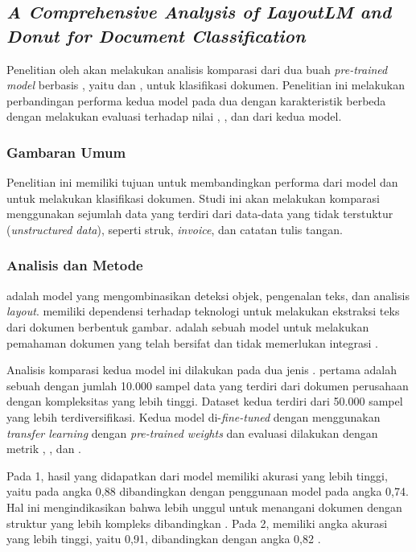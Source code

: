 \subsection{\textit{A Comprehensive Analysis of LayoutLM and Donut for Document Classification}}
\label{sec:penelitian-1}
Penelitian oleh   akan melakukan analisis komparasi dari dua buah \textit{pre-trained model} berbasis \transformer{}, yaitu \layoutlm{} dan \donut, untuk klasifikasi dokumen. Penelitian ini melakukan perbandingan performa kedua model pada dua \dataset{} dengan karakteristik berbeda dengan melakukan evaluasi 
terhadap nilai \accuracy, \precision, dan \fscore{} dari kedua model. 

\subsubsection{Gambaran Umum}
Penelitian ini memiliki tujuan untuk membandingkan performa dari model \donut{} dan \layoutlm{} untuk melakukan klasifikasi dokumen. Studi ini akan 
melakukan komparasi menggunakan sejumlah data yang terdiri dari data-data yang tidak terstuktur (\textit{unstructured data}), seperti struk, \textit{invoice}, dan catatan tulis tangan.

\subsubsection{Analisis dan Metode}
\layoutlm{} adalah model yang mengombinasikan deteksi objek, pengenalan teks, dan analisis \textit{layout}. \layoutlm{} memiliki dependensi terhadap teknologi \ocr{} untuk melakukan ekstraksi teks dari dokumen berbentuk gambar. \donut{} adalah sebuah model \transformer{} untuk melakukan pemahaman dokumen yang telah bersifat \sotafull{} dan tidak memerlukan integrasi \ocr{}.

Analisis komparasi kedua model ini dilakukan pada dua jenis \dataset. \datasetfl{} pertama adalah sebuah \dataset{} dengan jumlah 10.000 sampel data yang terdiri dari dokumen perusahaan dengan kompleksitas yang lebih tinggi. Dataset 
kedua terdiri dari 50.000 sampel yang lebih terdiversifikasi. Kedua model di-\textit{fine-tuned} dengan menggunakan \textit{transfer learning} dengan \textit{pre-trained weights} dan evaluasi dilakukan dengan metrik \accuracy, \precision, dan \fscore.  

Pada \dataset{} 1, hasil yang didapatkan dari model \layoutlm{} memiliki akurasi yang lebih tinggi, yaitu pada angka 0,88 dibandingkan dengan penggunaan model \donut{} pada angka 0,74. Hal ini mengindikasikan bahwa \layoutlm{} lebih unggul untuk menangani dokumen dengan struktur yang lebih kompleks dibandingkan \donut{}. Pada \dataset{} 2, \donut{} memiliki angka akurasi yang lebih tinggi, yaitu 0,91, dibandingkan \layoutlm{} dengan angka 0,82 \parencite{bajrami2023comprehensive}.

